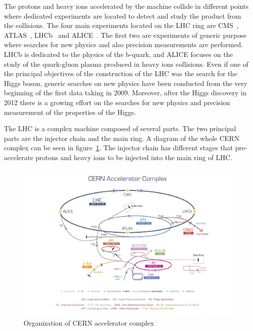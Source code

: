 The protons and heavy ions accelerated by the machine collide in different points where dedicated experiments are located to detect and study the product from the collisions. The four main experiments located on the LHC ring are CMS~\cite{Bayatian:922757,Bayatian:942733}, ATLAS~\cite{ATLAS:1999}, LHCb~\cite{Alves:2008zz} and ALICE~\cite{Cortese:879894}. The first two are experiments of generic purpose where searches for new physics and also precision measurements are performed. LHCb is dedicated to the physics of the b-quark, and ALICE focuses on the study of the quark-gluon plasma produced in heavy ions collisions. Even if one of the principal objectives of the construction of the LHC was the search for the Higgs boson, generic searches on new physics have been conducted from the very beginning of the first data taking in 2009. Moreover, after the Higgs discovery in 2012 there is a growing effort on the searches for new physics and precision measurement of the properties of the Higgs.

The LHC is a complex machine composed of several parts. The two principal parts are the injector chain and the main ring. A diagram of the whole CERN complex can be seen in figure~\ref{fig:Complex}. The injector chain has different stages that pre-accelerate protons and heavy ions to be injected into the main ring of LHC. %

\begin{figure}[!Hhtbp]
  \begin{center}
    \includegraphics[trim=4.5cm 0cm 0cm 0cm, clip=true, width=1.15\textwidth]{figs/cern-lhc-4.jpg}
    \caption{Organization of CERN accelerator complex}
    \label{fig:Complex}
  \end{center}
\end{figure}

